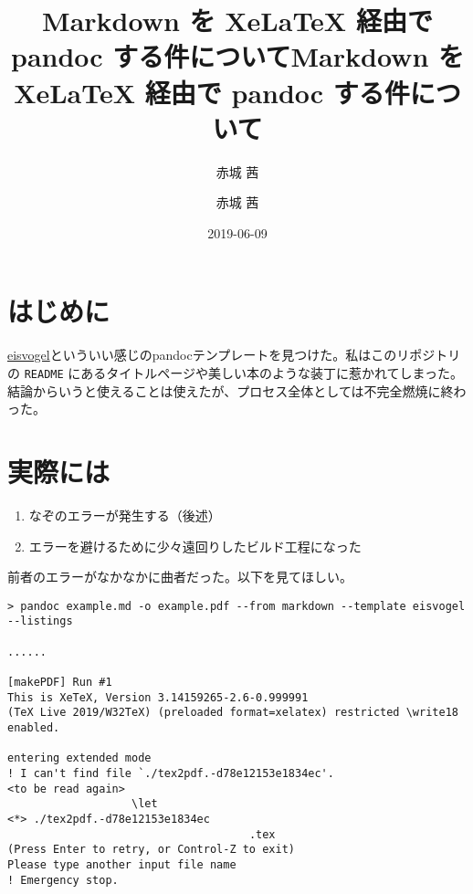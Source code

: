 \documentclass[
  a4paper,
,tablecaptionabove
]{scrartcl}
\title{Markdown を XeLaTeX 経由で pandoc する件について}
\author{赤城 茜}
\date{2019-06-09}
\title{Markdown を XeLaTeX 経由で pandoc する件について}
\author{赤城 茜}
\providecommand{\tightlist}{%
  \setlength{\itemsep}{0pt}\setlength{\parskip}{0pt}}
\begin{document}

\begin{titlepage}
\newcommand{\colorRule}[3][black]{\textcolor[HTML]{#1}{\rule{#2}{#3}}}
\end{titlepage}
\restoregeometry




\renewcommand*\contentsname{Contents}
{
\setcounter{tocdepth}{3}
\tableofcontents
\newpage
}
\hypertarget{ux306fux3058ux3081ux306b}{%
\section{はじめに}\label{ux306fux3058ux3081ux306b}}

\href{https://github.com/Wandmalfarbe/pandoc-latex-template}{eisvogel}といういい感じのpandocテンプレートを見つけた。私はこのリポジトリの
\texttt{README}
にあるタイトルページや美しい本のような装丁に惹かれてしまった。結論からいうと使えることは使えたが、プロセス全体としては不完全燃焼に終わった。

\hypertarget{ux5b9fux969bux306bux306f}{%
\section{実際には}\label{ux5b9fux969bux306bux306f}}

\begin{enumerate}
\def\labelenumi{\arabic{enumi}.}
\tightlist
\item
  なぞのエラーが発生する（後述）
\item
  エラーを避けるために少々遠回りしたビルド工程になった
\end{enumerate}

前者のエラーがなかなかに曲者だった。以下を見てほしい。

\begin{verbatim}
> pandoc example.md -o example.pdf --from markdown --template eisvogel --listings

......

[makePDF] Run #1
This is XeTeX, Version 3.14159265-2.6-0.999991 
(TeX Live 2019/W32TeX) (preloaded format=xelatex) restricted \write18 enabled.

entering extended mode
! I can't find file `./tex2pdf.-d78e12153e1834ec'.
<to be read again>
                   \let
<*> ./tex2pdf.-d78e12153e1834ec
                                     .tex
(Press Enter to retry, or Control-Z to exit)
Please type another input file name
! Emergency stop.
\end{verbatim}
\end{document}
